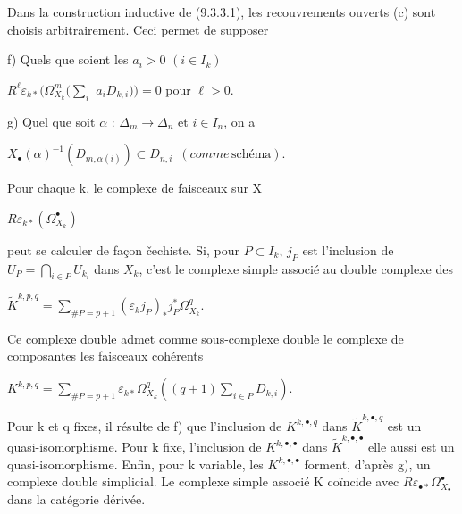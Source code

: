 \documentclass[11pt,twoside]{article}
\newcommand{\DFormula}[1]{%
  \par\smallskip\noindent\hspace*{0pt}\(\displaystyle #1\)\par\smallskip
}
\begin{document}
Dans la construction inductive de (9.3.3.1), les recouvrements ouverts (c) sont choisis arbitrairement. Ceci permet de supposer\par
\par\medskip
f) Quels que soient les \(a_{i}>0\) \((i\in I_{k})\)\par
\par\medskip
\(R^{\ell }\varepsilon _{k\ast }(\Omega _{X_{k}}^{m}(\sum _{i}\) \(a_{i}D_{k,i}))=0\)   pour \(\ell >0\).\par
\par\medskip
g) Quel que soit \(\alpha \) : \(\Delta _{m}\to \Delta _{n}\) et \(i\in I_{n}\), on a\par
\par\medskip
\DFormula{X_{\bullet }(\alpha )^{−1}(D_{m,\alpha (i)})\subset D_{n,i}\,\,\,(comme\,\text{schéma}).}
\par\medskip
Pour chaque k, le complexe de faisceaux sur X\par
\par\medskip
\DFormula{R\varepsilon _{k\ast }(\Omega _{X_{k}}^{\bullet })}
\par\medskip
peut se calculer de façon čechiste. Si, pour \(P\subset I_{k}\), \(j_{P}\) est l’inclusion de \(U_{P}=⋂_{i\in P}U_{k_{i}}\) dans \(X_{k}\), c’est le complexe simple associé au double complexe des\par
\par\medskip
\DFormula{\widetilde{K}^{k,p,q}=\sum _{\#P=p+1}(\varepsilon _{k}j_{P})_{\ast }j_{P}^{\ast }\Omega _{X_{k}}^{q}.}
\par\medskip
Ce complexe double admet comme sous-complexe double le complexe de composantes les faisceaux cohérents\par
\par\medskip
\DFormula{K^{k,p,q}=\sum _{\#P=p+1}\varepsilon _{k\ast }\Omega _{X_{k}}^{q}((q+1)\sum _{i\in P}D_{k,i}).}
\par\medskip
Pour k et q fixes, il résulte de f) que l’inclusion de \(K^{k,\bullet ,q}\) dans \(\widetilde{K}^{k,\bullet ,q}\) est un quasi-isomorphisme. Pour k fixe, l’inclusion de \(K^{k,\bullet ,\bullet }\) dans \(\widetilde{K}^{k,\bullet ,\bullet }\) elle aussi est un quasi-isomorphisme. Enfin, pour k variable, les \(K^{k,\bullet ,\bullet }\) forment, d’après g), un complexe double simplicial. Le complexe simple associé K coïncide avec \(R\varepsilon _{\bullet \ast }\Omega _{X_{\bullet }}^{\bullet }\) dans la catégorie dérivée.\par
\par\medskip
\end{document}
